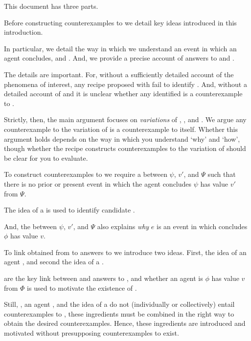 \begin{note}
  This document has three parts.
  \begin{TOCEnum}
  \item

    Before constructing counterexamples to \issueInclusion{} we detail key ideas introduced in this introduction.

    In particular, we detail the way in which we understand an event in which an agent concludes, and .
    And, we provide a precise account of answers to \qWhy{} and \qHow{}.

    The details are important.
    For, without a sufficiently detailed account of the phenomena of interest, any recipe proposed with fail to identify .
    And, without a detailed account of \qWhy{} and \qHow{} it is unclear whether any identified  is a counterexample to \issueInclusion{}.

    Strictly, then, the main argument focuses on \emph{variations} of \qWhy{}, \qHow{}, and \issueInclusion{}.
    We argue any counterexample to the variation of \issueInclusion{} is a counterexample to \issueInclusion{} itself.
    Whether this argument holds depends on the way in which you understand `why' and `how', though whether the recipe constructs counterexamples to the variation of \issueInclusion{} should be clear for you to evaluate.
  \item

    To construct counterexamples to \issueInclusion{} we require a \ros{} between \(\psi\), \(v'\), and \(\Psi\) such that there is no prior or present event in which the agent concludes \(\psi\) has value \(v'\) from \(\Psi\).

    The idea of a \fc{} is used to identify candidate \ros{}.

    And, the \ros{} between \(\psi\), \(v'\), and \(\Psi\) also explains \emph{why} \(e\) is an event in which \vAgent{} concludes \(\phi\) has value \(v\).

    To link  obtained from  to answers to \qWhy{} we introduce two ideas.
    First, the idea of an agent \tCV{}, and second the idea of a \requ{}.

     are the key link between \ros{} and answers to \qWhy{}, and whether an agent is \tCV{} \(\phi\) has value \(v\) from \(\Phi\) is used to motivate the existence of .

    Still, , an agent , and the idea of a \requ{} do not (individually or collectively) entail counterexamples to \issueInclusion{}, these ingredients must be combined in the right way to obtain the desired counterexamples.
    Hence, these ingredients are introduced and motivated without presupposing counterexamples to \issueInclusion{} exist.
  \item


\end{TOCEnum}
\end{note}
